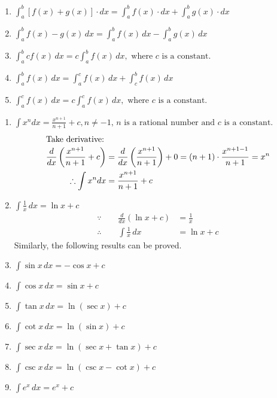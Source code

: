 \pagebreak
{}
\begin{enumerate}
    \item $\int_a^b [f(x) + g(x)] \cdot dx = \int_a^b f(x) \cdot dx + \int_a^b g(x) \cdot dx$
    \item $\int_a^b f(x) - g(x) \, dx = \int_a^b f(x) \, dx - \int_a^b g(x) \, dx $
    \item $\int_a^b c f(x) \, dx = c \int_a^b f(x) \, dx, \text{ where } c \text{ is a constant.}$
    \item $\int_a^b f(x) \, dx = \int_a^c f(x) \, dx + \int_c^b f(x) \, dx$
    \item $\int_a^c f(x) \, dx = c \int_a^c f(x) \, dx, \text{ where } c \text{ is a constant.}$\\
\end{enumerate}
    

\begin{enumerate}
    \item $\int x^n dx = \frac{x^{n+1}}{n+1} + c, n \ne -1, \, n \text{ is a rational number and } c \text{ is a constant.}$
        \begin{align*}
            \intertext{Take derivative:}
            \frac{d}{dx} \left( \frac{x^{n+1}}{n+1} + c \right) &= \frac{d}{dx} \left( \frac{x^{n+1}}{n+1} \right) + 0 = (n+1) \cdot \frac{x^{n+1-1}}{n+1} = x^n \\
            \therefore \int x^n dx &= \frac{x^{n+1}}{n+1} + c
        \end{align*}
    
    \item $\int \frac{1}{x} \, dx = \ln x + c$
        \begin{align*}
            \because \qquad\frac{d}{dx} \left( \ln x + c \right) &= \frac{1}{x}\\
            \therefore \qquad\int \frac{1}{x} \, dx &= \ln x + c 
        \end{align*}
        Similarly, the following results can be proved.

    \item $\int \sin x \, dx = -\cos x + c$
    \item $\int \cos x \, dx = \sin x + c$
    \item $\int \tan x \, dx = \ln (\sec x) + c $
    \item $\int \cot x \, dx = \ln (\sin x) + c$
    \item $\int \sec x \, dx = \ln (\sec x + \tan x) + c$
    \item $\int \csc x \, dx = \ln (\csc x - \cot x) + c$
    \item $\int e^x \, dx = e^x + c$
\end{enumerate}

